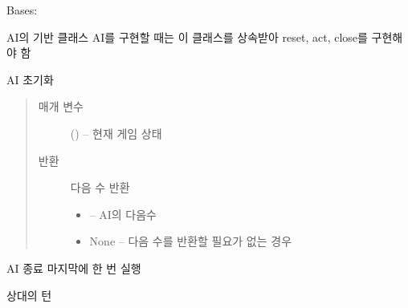 \documentclass[letterpaper,10pt,english]{sphinxmanual}
\begin{document}
\begin{fulllineitems}
\label{\detokenize{agents:agents.BaseAgent}}
Bases: 

AI의 기반 클래스
AI를 구현할 때는 이 클래스를 상속받아 reset, act, close를 구현해야 함

\begin{fulllineitems}
\label{\detokenize{agents:agents.BaseAgent.act}}
AI 초기화
\begin{quote}\begin{description}
\item[{매개 변수}] \leavevmode
{} ({\hyperref[\detokenize{scripts:scripts.run_game.State}]{}}) -- 현재 게임 상태

\item[{반환}] \leavevmode

다음 수 반환
\begin{itemize}
\item {} 
 -- AI의 다음수

\item {} 
None -- 다음 수를 반환할 필요가 없는 경우

\end{itemize}


\end{description}\end{quote}

\end{fulllineitems}


\begin{fulllineitems}
\label{\detokenize{agents:agents.BaseAgent.close}}
AI 종료
마지막에 한 번 실행

\end{fulllineitems}


\begin{fulllineitems}
\label{\detokenize{agents:agents.BaseAgent.opponent_color}}
상대의 턴


\end{fulllineitems}
\end{fulllineitems}
\end{document}
